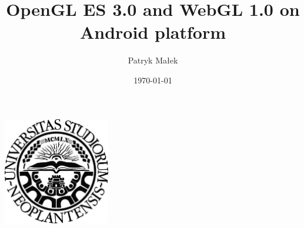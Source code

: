 \documentclass[a4paper,11pt]{article}
\begin{document}
\label{Title} 
\title{OpenGL ES 3.0 and WebGL 1.0 on Android platform \vspace{1pc}}
\author{Patryk Małek \vspace{-0.7pc}}
\date{\today}         %
\maketitle
\thispagestyle{empty}


\vspace{5pc}

\centerline{
\includegraphics[width=0.35\textwidth,height=0.35\textheight,keepaspectratio]{NoviSadLogoGray.jpg}
}

\vspace{9pc}
\end{document}
